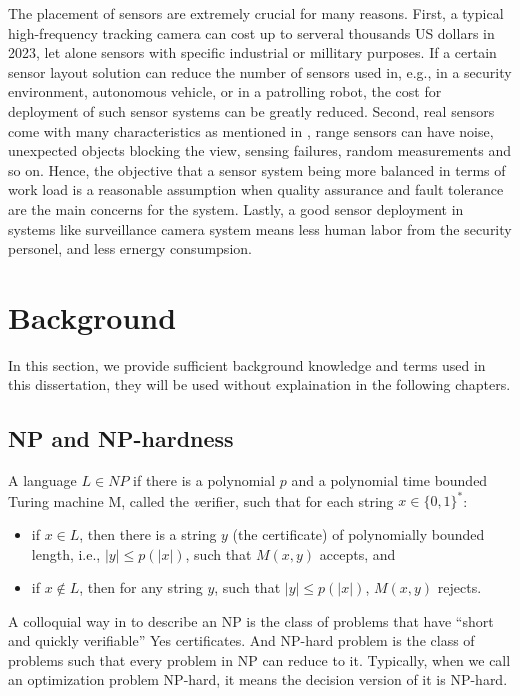 The placement of sensors are extremely crucial for many reasons.
First, a typical high-frequency tracking camera can cost up to serveral thousands US dollars in 2023, 
let alone sensors with specific industrial or millitary purposes. If a certain sensor layout solution
can reduce the number of sensors used in, e.g., in a security environment, autonomous vehicle, or in a patrolling robot,
the cost for deployment of such sensor systems can be greatly reduced.
Second, real sensors come with many characteristics as mentioned in \cite{sebastian2005prob},
range sensors can have noise, unexpected objects blocking the view, sensing failures, random measurements and so on.
Hence, the objective that a sensor system being more balanced in terms of work load is a reasonable assumption
when quality assurance and fault tolerance are the main concerns for the system. 
Lastly, a good sensor deployment in systems like surveillance camera system means less human labor from the security personel,
and less ernergy consumpsion.
\section{Background}
In this section, we provide sufficient background knowledge and terms used in this dissertation, 
they will be used without explaination in the following chapters. 

\subsection{NP and NP-hardness}
\begin{definition}
    A language $L\in NP$ if there is a polynomial $p$ and a polynomial time bounded Turing machine M, 
    called the {\textit verifier}, such that for each string $x\in \{0, 1\}^*$: 
    \begin{itemize}
        \item if $x\in L$, then there is a string $y$ (the certificate) of polynomially bounded length, i.e., $|y| \leq p(|x|)$,
        such that $M(x, y)$ accepts, and 
        \item if $x\notin L$, then for any string $y$, such that $|y|\leq p(|x|)$, $M(x,y)$ rejects.
    \end{itemize}
\end{definition}

A colloquial way in \cite{vazirani2001approximation} to describe an NP is the class of problems that have ``short and quickly verifiable'' 
Yes certificates.
And NP-hard problem is the class of problems such that every problem in NP can reduce to it.
Typically, when we call an optimization problem NP-hard, it means the decision version of it is NP-hard.

